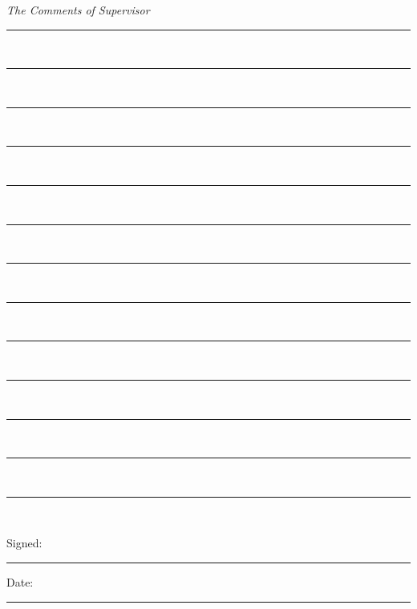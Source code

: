 {\centering \huge\textit{The Comments of Supervisor} \par}
\vspace{1cm}
\rule[0.5cm]{14cm}{0.5pt}\\ %
\vspace{0.1cm}

\rule[0.5cm]{14cm}{0.5pt}\\ %
\vspace{0.1cm}

\rule[0.5cm]{14cm}{0.5pt}\\ %
\vspace{0.1cm}

\rule[0.5cm]{14cm}{0.5pt}\\ %
\vspace{0.1cm}

\rule[0.5cm]{14cm}{0.5pt}\\ %
\vspace{0.1cm}

\rule[0.5cm]{14cm}{0.5pt}\\ %
\vspace{0.1cm}

\rule[0.5cm]{14cm}{0.5pt}\\ %
\vspace{0.1cm}

\rule[0.5cm]{14cm}{0.5pt}\\ %
\vspace{0.1cm}

\rule[0.5cm]{14cm}{0.5pt}\\ %
\vspace{0.1cm}

\rule[0.5cm]{14cm}{0.5pt}\\ %
\vspace{0.1cm}

\rule[0.5cm]{14cm}{0.5pt}\\ %
\vspace{0.1cm}

\rule[0.5cm]{14cm}{0.5pt}\\ %
\vspace{0.1cm}

\rule[0.5cm]{14cm}{0.5pt}\\ %
\vspace{0.7cm}

\noindent Signed:\\
\rule[0.5em]{25em}{0.5pt} %
 
\noindent Date:\\
\rule[0.5em]{25em}{0.5pt} %
